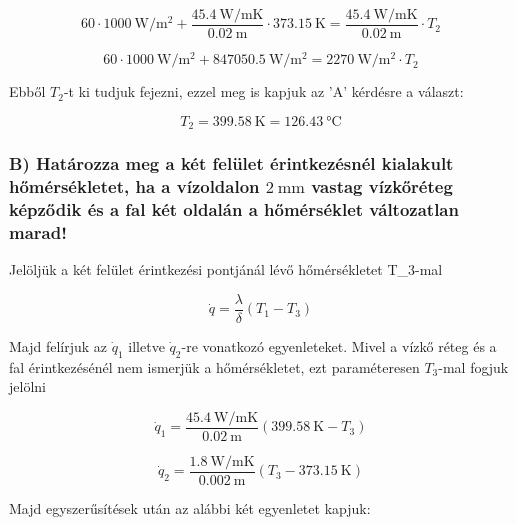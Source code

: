 \begin{equation}
60 \cdot \SI{1000}{\watt\per\meter\squared}+  \frac{\SI{45.4}{\watt\per\meter\kelvin}}{\SI{0.02}{\meter}} \cdot \SI{373.15}{\kelvin}=  \frac{\SI{45.4}{\watt\per\meter\kelvin}}{\SI{0.02}{\meter}} \cdot T_2
\end{equation}

\begin{equation}
60 \cdot \SI{1000}{\watt\per\meter\squared} + \SI{847050.5}{\watt\per\meter\squared} = \SI{2270}{\watt\per\meter\squared} \cdot T_2
\end{equation}
\vspace{1mm}

Ebből $T_2$-t ki tudjuk fejezni, ezzel meg is kapjuk az 'A' kérdésre a választ:

\begin{equation}
T_2 = \SI{399.58}{\kelvin} = \SI{126.43}{\celsius}
\end{equation}

\vspace{1mm}

\subsubsection*{B)  Határozza meg a két felület érintkezésnél kialakult hőmérsékletet, ha a vízoldalon $\SI{2}{\milli\meter}$ vastag vízkőréteg képződik és a fal két oldalán a hőmérséklet változatlan marad!}

Jelöljük a két felület érintkezési pontjánál lévő hőmérsékletet T_3-mal

\begin{equation}
	 \dot{q} = \frac{\lambda}{\delta} (T_1 - T_3)
\end{equation}

Majd felírjuk az $\dot{q}_1$ illetve $\dot{q}_2$-re vonatkozó egyenleteket. Mivel a vízkő réteg és a fal érintkezésénél nem ismerjük a hőmérsékletet, ezt paraméteresen $T_3$-mal fogjuk jelölni

\begin{equation}
	 \dot{q}_1 =  \frac{\SI{45.4}{\watt\per\meter\kelvin}}{\SI{0.02}{\meter}} (\SI{399.58}{\kelvin} - T_3)
\end{equation}


\begin{equation}
	 \dot{q}_2 =  \frac{\SI{1.8}{\watt\per\meter\kelvin}}{\SI{0.002}{\meter}} (T_3 - \SI{373.15}{\kelvin})
\end{equation}

Majd egyszerűsítések után az alábbi két egyenletet kapjuk:

